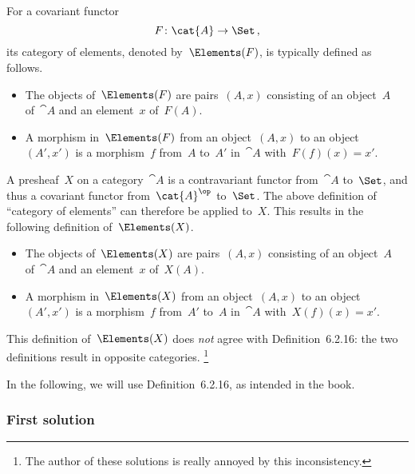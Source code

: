 \subsection{}


\begin{warning}
	For a covariant functor
	\[
		F \colon \cat{A} \to \Set \,,
	\]
	its category of elements, denoted by~$\Elements(F)$, is typically defined as follows.
	\begin{itemize}

		\item
			The objects of~$\Elements(F)$ are pairs~$(A, x)$ consisting of an object~$A$ of~$\cat{A}$ and an element~$x$ of~$F(A)$.

		\item
			A morphism in~$\Elements(F)$ from an object~$(A, x)$ to an object~$(A', x')$ is a morphism~$f$ from~$A$ to~$A'$ in~$\cat{A}$ with~$F(f)(x) = x'$.

	\end{itemize}
	A presheaf~$X$ on a category~$\cat{A}$ is a contravariant functor from~$\cat{A}$ to~$\Set$, and thus a covariant functor from~$\cat{A}^{\op}$ to~$\Set$.
	The above definition of \enquote{category of elements} can therefore be applied to~$X$.
	This results in the following definition of~$\Elements(X)$.
	\begin{itemize}

		\item
			The objects of~$\Elements(X)$ are pairs~$(A, x)$ consisting of an object~$A$ of~$\cat{A}$ and an element~$x$ of~$X(A)$.

		\item
			A morphism in~$\Elements(X)$ from an object~$(A, x)$ to an object~$(A', x')$ is a morphism~$f$ from~$A'$ to~$A$ in~$\cat{A}$ with~$X(f)(x) = x'$.

	\end{itemize}
	This definition of~$\Elements(X)$ does \emph{not} agree with Definition~6.2.16:
	the two definitions result in opposite categories.%
	\footnote{
		The author of these solutions is really annoyed by this inconsistency.
	}

	In the following, we will use Definition~6.2.16, as intended in the book.
\end{warning}



\subsubsection*{First solution}

